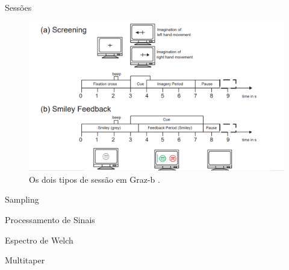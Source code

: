 \documentclass{beamer}
\begin{document}
\begin{frame}{Sessões}
  \begin{figure}[h!]
  	\centering
 	\includegraphics[scale=0.35]{./Images/graz_b_session}
 	 \caption{Os dois tipos de sess\~ao em Graz-b \cite{GrazBData}.}
 	\label{fig:Graz-Session}
 \end{figure}
\end{frame}
   

\begin{frame}{Sampling}
\color{black}
\scalebox{.7}{
	}
\end{frame}

\begin{frame}{Processamento de Sinais}
\scalebox{.8}{

}
\end{frame}

\begin{frame}{Espectro de Welch}
            \color{black}

\scalebox{.6}{

}
\end{frame}

\begin{frame}{Multitaper}
            \color{black}

\scalebox{.5}{

}
\end{frame}
\end{document}
